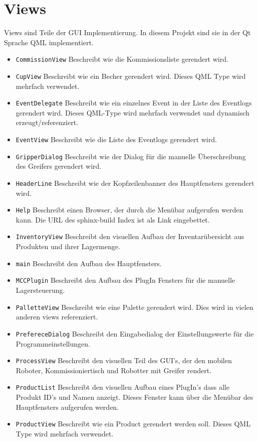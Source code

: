 \section{Views}
Views sind Teile der GUI Implementierung. In diesem Projekt sind sie in der Qt Sprache QML implementiert.
\begin{itemize}
    \item \verb|CommissionView| Beschreibt wie die Kommissionsliste gerendert wird.
    \item \verb|CupView| Beschreibt wie ein Becher gerendert wird. Dieses QML Type wird mehrfach verwendet.
    \item \verb|EventDelegate| Beschreibt wie ein einzelnes Event in der Liste des Eventlogs gerendert wird. Dieses QML-Type wird mehrfach verwendet und dynamisch erzeugt/referenziert.
    \item \verb|EventView| Beschreibt wie die Liste des Eventlogs gerendert wird.
    \item \verb|GripperDialog| Beschreibt wie der Dialog für die manuelle Überschreibung des Greifers gerendert wird.
    \item \verb|HeaderLine| Beschreibt wie der Kopfzeilenbanner des Hauptfensters gerendert wird.
    \item \verb|Help| Beschreibt einen Browser, der durch die Menübar aufgerufen werden kann. Die URL des sphinx-build Index ist als Link eingebettet. 
    \item \verb|InventoryView| Beschreibt den visuellen Aufbau der Inventarübersicht aus Produkten und ihrer Lagermenge.
    \item \verb|main| Beschreibt den Aufbau des Hauptfensters.
    \item \verb|MCCPlugin| Beschreibt den Aufbau des PlugIn Fensters für die manuelle Lagersteuerung.
    \item \verb|PalletteView| Beschreibt wie eine Palette gerendert wird. Dies wird in vielen anderen views referenziert. 
    \item \verb|PrefereceDialog| Beschreibt den Eingabedialog der Einstellungswerte für die Programmeinstellungen.
    \item \verb|ProcessView| Beschreibt den visuellen Teil des GUI's, der den mobilen Roboter, Kommissioniertisch und Robotter mit Greifer rendert. 
    \item \verb|ProductList| Beschreibt den visuellen Aufbau eines PlugIn's dass alle Produkt ID's und Namen anzeigt. Dieses Fenster kann über die Menübar des Hauptfensters aufgerufen werden.
    \item \verb|ProductView| Beschreibt wie ein Product gerendert werden soll. Dieses QML Type wird mehrfach verwendet.

\end{itemize}
